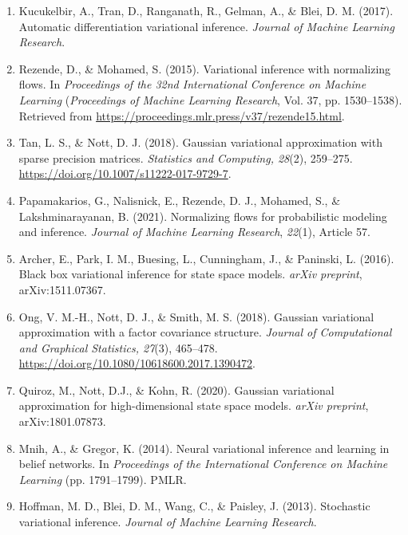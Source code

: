 \documentclass[12pt,a4paper]{article}
\begin{document}
\begin{enumerate}
\item \label{Kucukelbir2016} Kucukelbir, A., Tran, D., Ranganath, R., Gelman, A., \& Blei, D. M. (2017). Automatic differentiation variational inference. \textit{Journal of Machine Learning Research}.

\item \label{rezende2015} Rezende, D., \& Mohamed, S. (2015). Variational inference with normalizing flows. In \emph{Proceedings of the 32nd International Conference on Machine Learning} (\emph{Proceedings of Machine Learning Research}, Vol. 37, pp. 1530--1538). Retrieved from \url{https://proceedings.mlr.press/v37/rezende15.html}.

\item \label{tan2018} Tan, L. S., \& Nott, D. J. (2018). Gaussian variational approximation with sparse precision matrices. \textit{Statistics and Computing, 28}(2), 259–275. \url{https://doi.org/10.1007/s11222-017-9729-7}.

\item \label{papa2021} Papamakarios, G., Nalisnick, E., Rezende, D. J., Mohamed, S., \& Lakshminarayanan, B. (2021). Normalizing flows for probabilistic modeling and inference. \emph{Journal of Machine Learning Research}, \emph{22}(1), Article 57.

\item \label{archer2016} Archer, E., Park, I. M., Buesing, L., Cunningham, J., \& Paninski, L. (2016). Black box variational inference for state space models. \textit{arXiv preprint}, arXiv:1511.07367.

\item \label{ong2018} Ong, V. M.-H., Nott, D. J., \& Smith, M. S. (2018). Gaussian variational approximation with a factor covariance structure. \textit{Journal of Computational and Graphical Statistics, 27}(3), 465–478. \url{https://doi.org/10.1080/10618600.2017.1390472}.

\item \label{quiroz2020} Quiroz, M., Nott, D.J., \& Kohn, R. (2020). Gaussian variational approximation for high-dimensional state space models. \textit{arXiv preprint}, arXiv:1801.07873.

\item \label{mnih2014} Mnih, A., \& Gregor, K. (2014). Neural variational inference and learning in belief networks. In \emph{Proceedings of the International Conference on Machine Learning} (pp. 1791--1799). PMLR.

\item \label{hoff2013} Hoffman, M. D., Blei, D. M., Wang, C., \& Paisley, J. (2013). Stochastic variational inference. \emph{Journal of Machine Learning Research}.


\end{enumerate}
\end{document}
